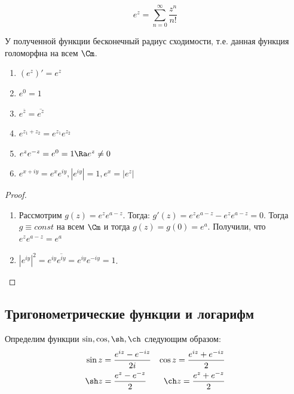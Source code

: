 \begin{definition}
    \[e^z = \sum_{n = 0}^\infty \frac{z^n}{n!}\]
\end{definition}

\begin{note}
    У полученной функции бесконечный радиус сходимости, т.е. данная функция голоморфна на всем \(\Cm\).
\end{note}

\begin{note}
    \begin{enumerate}
        \item \((e^z)' = e^z\)
        \item \(e^0 = 1\)
        \item \(e^{\overline{z}} = \overline{e^z}\)
        \item \(e^{z_1 + z_2} = e^{z_1}e^{z_2}\)
        \item \(e^{z}e^{-z} = e^{0} = 1 \Ra e^z \ne 0\)
        \item \(e^{x + iy} = e^xe^{iy}, |e^{iy}| = 1, e^x = |e^z|\)
    \end{enumerate}
\end{note}
\begin{proof}
    \begin{enumerate}
        \item[4.] Рассмотрим \(g(z) = e^ze^{a - z}\). Тогда: \(g'(z) = e^ze^{a - z} - e^ze^{a - z} = 0\). Тогда \(g \equiv const\) на всем \(\Cm\) и тогда \(g(z) = g(0) = e^a\). Получили, что \(e^ze^{a - z} = e^a\)
        \item[6.] \(|e^{iy}|^2 = e^{iy}\overline{e^{iy}} = e^{iy}e^{-iy} = 1\).
    \end{enumerate}
\end{proof}

\subsection{Тригонометрические функции и логарифм}

\begin{definition}
    Определим функции \(\sin, \cos, \sh, \ch\) следующим образом:
    \begin{align*}
        & \sin z = \frac{e^{iz} - e^{-iz}}{2i} & \cos z = \frac{e^{iz} + e^{-iz}}{2} &\\
        & \sh z = \frac{e^{z} - e^{-z}}{2} & \ch z = \frac{e^{z} + e^{-z}}{2} & \\
    \end{align*}
\end{definition}

